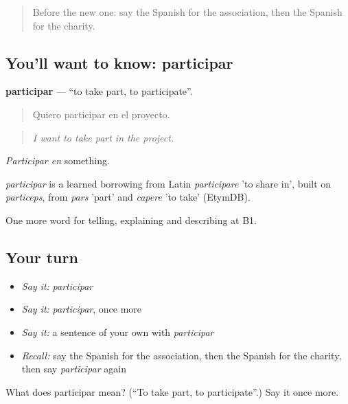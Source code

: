 \label{lesson:ES-C606-participar}



\begin{quote}
Before the new one: say the Spanish for the association, then the Spanish for the charity.
\end{quote}

\subsection*{You'll want to know: participar}
\textbf{participar} — \textquotedblleft{}to take part, to participate\textquotedblright{}.

\begin{quote}
Quiero participar en el proyecto.
\end{quote}

\begin{quote}
\emph{I want to take part in the project.}
\end{quote}

\emph{Participar en} something.

\begin{cousinweb}
\emph{participar} is a learned borrowing from Latin \emph{participare} 'to share in', built on \emph{particeps}, from \emph{pars} 'part' and \emph{capere} 'to take' (EtymDB).
\end{cousinweb}

\begin{grammarlens}[title={What you've built}]
One more word for telling, explaining and describing at B1.
\end{grammarlens}

\subsection*{Your turn}
\begin{itemize}
\raggedright
  \item \emph{Say it:} \emph{participar}
  \item \emph{Say it:} \emph{participar}, once more
  \item \emph{Say it:} a sentence of your own with \emph{participar}
  \item \emph{Recall:} say the Spanish for the association, then the Spanish for the charity, then say \emph{participar} again
\end{itemize}

\begin{tcolorbox}[breakable,colback=teal!4,colframe=teal!35!black,title={Before you move on}]
What does participar mean? (\textquotedblleft{}To take part, to participate\textquotedblright{}.) Say it once more.
\end{tcolorbox}
